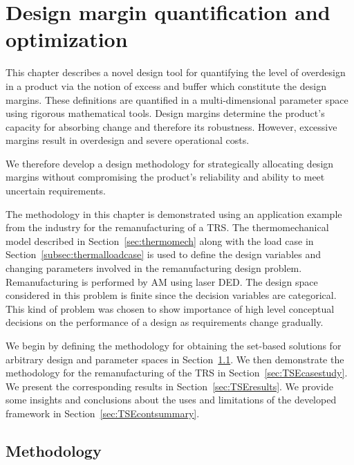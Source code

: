 \chapter{Design margin quantification and optimization}
\label{ch:TSEcont}

This chapter describes a novel design tool for quantifying the level of overdesign in a product via the notion of excess and buffer which constitute the design margins. These definitions are quantified in a multi-dimensional parameter space using rigorous mathematical tools. Design margins determine the product's capacity for absorbing change and therefore its robustness. However, excessive margins result in overdesign and severe operational costs.

We therefore develop a design methodology for strategically allocating design margins without compromising the product's reliability and ability to meet uncertain requirements.

The methodology in this chapter is demonstrated using an application example from the industry for the remanufacturing of a \ac{TRS}. The thermomechanical model described in Section~\ref{sec:thermomech} along with the load case in Section~\ref{subsec:thermalloadcase} is used to define the design variables and changing parameters involved in the remanufacturing design problem. Remanufacturing is performed by \ac{AM} using laser \ac{DED}. The design space considered in this problem is finite since the decision variables are categorical. This kind of problem was chosen to show importance of high level conceptual decisions on the performance of a design as requirements change gradually.

We begin by defining the methodology for obtaining the set-based solutions for arbitrary design and parameter spaces in Section~\ref{sec:TSEmethods}. We then demonstrate the methodology for the remanufacturing of the \ac{TRS} in Section~\ref{sec:TSEcasestudy}. We present the corresponding results in Section~\ref{sec:TSEresults}. We provide some insights and conclusions about the uses and limitations of the developed framework in Section~\ref{sec:TSEcontsummary}.

\section{Methodology} \label{sec:TSEmethods}

